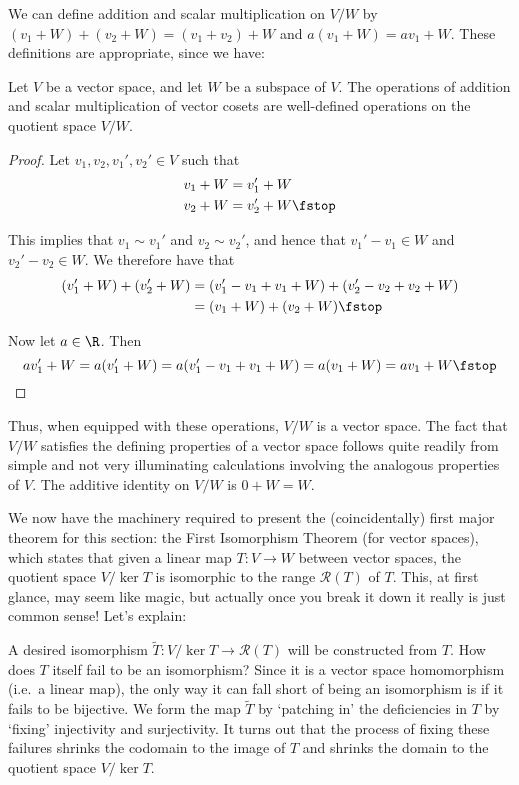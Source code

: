  We can define addition and scalar multiplication on \( V/W \) by \( (v_1+W)+(v_2+W)=(v_1+v_2)+W \) and \( a(v_1+W)=av_1+W \). These definitions are appropriate, since we have:
  \begin{proposition}
   Let \( V \) be a vector space, and let \( W \) be a subspace of \( V \). The operations of addition and scalar multiplication of vector cosets are well-defined operations on the quotient space \( V/W \).
 \end{proposition}
 \begin{proof}
   Let \( v_1,v_2,v_1',v_2'\in V \) such that
   \begin{align*}
     v_1+W&= v_1'+W\\
     v_2+W&= v_2'+W\fstop
   \end{align*}

   This implies that \( v_1\sim v_1' \) and \( v_2\sim v_2' \), and hence that \( v_1'-v_1\in W \) and \( v_2'-v_2\in W \). We therefore have that
   \begin{align*}
     (v_1'+W)+(v_2'+W)&= (v_1'-v_1+v_1+W)+(v_2'-v_2+v_2+W)\\
     &= (v_1+W)+(v_2+W)\fstop
   \end{align*}

   Now let \( a\in\R \). Then
   \[ av_1'+W=a(v_1'+W)=a(v_1'-v_1+v_1+W)=a(v_1+W)=av_1+W\fstop \]
 \end{proof}

 Thus, when equipped with these operations, \( V/W \) is a vector space. The fact that \( V/W \) satisfies the defining properties of a vector space follows quite readily from simple and not very illuminating calculations involving the analogous properties of \( V \). The additive identity on \( V/W \) is \( 0+W=W \).

 \vspace{3mm}

 We now have the machinery required to present the (coincidentally) first major theorem for this section: the First Isomorphism Theorem (for vector spaces), which states that given a linear map \( T:V\to W \) between vector spaces, the quotient space \( V/\ker T \) is isomorphic to the range \( \mathcal{R}(T) \) of \( T \). This, at first glance, may seem like magic, but actually once you break it down it really is just common sense! Let's explain:

 \vspace{3mm}

 A desired isomorphism \( \widetilde{T}:V/\ker T\to \mathcal{R}(T) \) will be constructed from \( T \). How does \( T \) itself fail to be an isomorphism? Since it is a vector space homomorphism (i.e.\ a linear map), the only way it can fall short of being an isomorphism is if it fails to be bijective. We form the map \( \widetilde{T} \) by `patching in' the deficiencies in \( T \) by `fixing' injectivity and surjectivity. It turns out that the process of fixing these failures shrinks the codomain to the image of \( T \) and shrinks the domain to the quotient space \( V/\ker T \).


